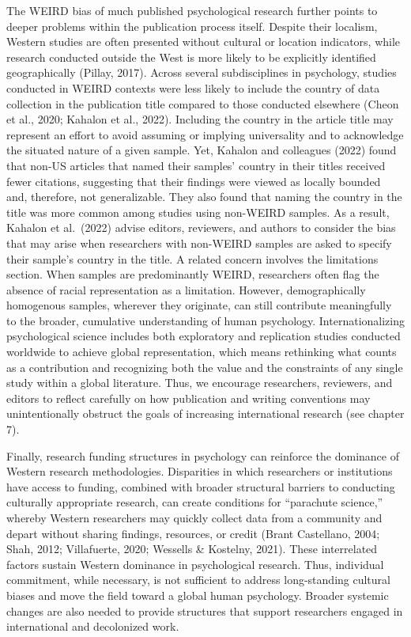 \documentclass[
  11pt,
]{book}
\begin{document}
The WEIRD bias of much published psychological research further points to deeper problems within the publication process itself. Despite their localism, Western studies are often presented without cultural or location indicators, while research conducted outside the West is more likely to be explicitly identified geographically (Pillay, 2017). Across several subdisciplines in psychology, studies conducted in WEIRD contexts were less likely to include the country of data collection in the publication title compared to those conducted elsewhere (Cheon et al., 2020; Kahalon et al., 2022). Including the country in the article title may represent an effort to avoid assuming or implying universality and to acknowledge the situated nature of a given sample. Yet, Kahalon and colleagues (2022) found that non-US articles that named their samples' country in their titles received fewer citations, suggesting that their findings were viewed as locally bounded and, therefore, not generalizable. They also found that naming the country in the title was more common among studies using non-WEIRD samples. As a result, Kahalon et al.~(2022) advise editors, reviewers, and authors to consider the bias that may arise when researchers with non-WEIRD samples are asked to specify their sample's country in the title. A related concern involves the limitations section. When samples are predominantly WEIRD, researchers often flag the absence of racial representation as a limitation. However, demographically homogenous samples, wherever they originate, can still contribute meaningfully to the broader, cumulative understanding of human psychology. Internationalizing psychological science includes both exploratory and replication studies conducted worldwide to achieve global representation, which means rethinking what counts as a contribution and recognizing both the value and the constraints of any single study within a global literature. Thus, we encourage researchers, reviewers, and editors to reflect carefully on how publication and writing conventions may unintentionally obstruct the goals of increasing international research (see chapter 7).

Finally, research funding structures in psychology can reinforce the dominance of Western research methodologies. Disparities in which researchers or institutions have access to funding, combined with broader structural barriers to conducting culturally appropriate research, can create conditions for ``parachute science,'' whereby Western researchers may quickly collect data from a community and depart without sharing findings, resources, or credit (Brant Castellano, 2004; Shah, 2012; Villafuerte, 2020; Wessells \& Kostelny, 2021). These interrelated factors sustain Western dominance in psychological research. Thus, individual commitment, while necessary, is not sufficient to address long-standing cultural biases and move the field toward a global human psychology. Broader systemic changes are also needed to provide structures that support researchers engaged in international and decolonized work.
\end{document}
